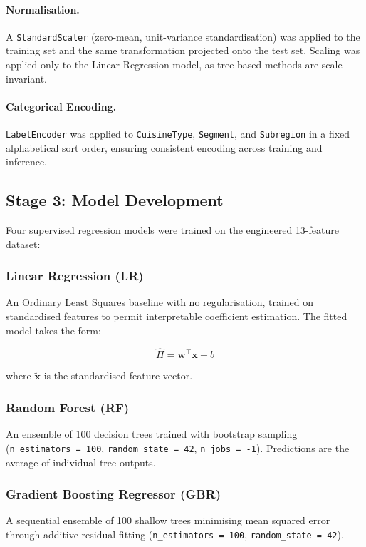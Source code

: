 \documentclass[10pt,a4paper,twocolumn]{article}
\begin{document}
\paragraph{Normalisation.}
A \texttt{StandardScaler} (zero-mean, unit-variance standardisation) was applied to
the training set and the same transformation projected onto the test set. Scaling was
applied only to the Linear Regression model, as tree-based methods are scale-invariant.

\paragraph{Categorical Encoding.}
\texttt{LabelEncoder} was applied to \texttt{CuisineType}, \texttt{Segment}, and
\texttt{Subregion} in a fixed alphabetical sort order, ensuring consistent encoding
across training and inference.

\subsection{Stage 3: Model Development}
\label{sec:models}

Four supervised regression models were trained on the engineered 13-feature dataset:

\subsubsection{Linear Regression (LR)}
An Ordinary Least Squares baseline with no regularisation, trained on standardised
features to permit interpretable coefficient estimation. The fitted model takes the form:

\begin{equation}
  \hat{\Pi} = \mathbf{w}^\top \tilde{\mathbf{x}} + b
  \label{eq:lr}
\end{equation}

where $\tilde{\mathbf{x}}$ is the standardised feature vector.

\subsubsection{Random Forest (RF)}
An ensemble of 100 decision trees trained with bootstrap sampling (\texttt{n\_estimators = 100},
\texttt{random\_state = 42}, \texttt{n\_jobs = -1}). Predictions are the average of
individual tree outputs.

\subsubsection{Gradient Boosting Regressor (GBR)}
A sequential ensemble of 100 shallow trees minimising mean squared error through additive
residual fitting (\texttt{n\_estimators = 100}, \texttt{random\_state = 42}).
\end{document}
